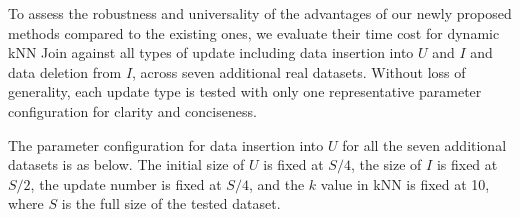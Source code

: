 To assess the robustness and universality of the advantages of our newly proposed methods compared to the existing ones, we evaluate their time cost for dynamic kNN Join against all types of update including data insertion into $U$ and $I$ and data deletion from $I$, across seven additional real datasets. Without loss of generality, each update type is tested with only one representative parameter configuration for clarity and conciseness.


The parameter configuration for data insertion into $U$ for all the seven additional datasets is as below. The initial size of $U$ is fixed at $S/4$, the size of $I$ is fixed at $S/2$, the update number is fixed at $S/4$, and the $k$ value in kNN is fixed at 10, where $S$ is the full size of the tested dataset.

